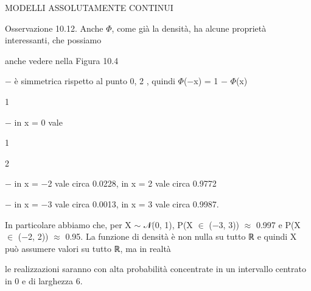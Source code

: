 \documentclass[a4paper,portrait,12pt]{article}
\begin{document}





\begin{flushleft}
MODELLI ASSOLUTAMENTE CONTINUI
\end{flushleft}





\begin{flushleft}
Osservazione 10.12. Anche $\Phi$, come gi\`{a} la densit\`{a}, ha alcune propriet\`{a} interessanti, che possiamo
\end{flushleft}


\begin{flushleft}
anche vedere nella Figura 10.4
\end{flushleft}


\begin{flushleft}
$-$ \`{e} simmetrica rispetto al punto 0, 2 , quindi $\Phi$($-$x) = 1 $-$ $\Phi$(x)
\end{flushleft}


1





\begin{flushleft}
$-$ in x = 0 vale
\end{flushleft}





1


2





\begin{flushleft}
$-$ in x = $-$2 vale circa 0.0228, in x = 2 vale circa 0.9772
\end{flushleft}


\begin{flushleft}
$-$ in x = $-$3 vale circa 0.0013, in x = 3 vale circa 0.9987.
\end{flushleft}


\begin{flushleft}
In particolare abbiamo che, per X $\sim$ 𝒩(0, 1), P(X $\in$ ($-$3, 3)) $\approx$ 0.997 e P(X $\in$ ($-$2, 2)) $\approx$ 0.95. La funzione di densit\`{a} \`{e} non nulla su tutto ℝ e quindi X pu\`{o} assumere valori su tutto ℝ, ma in realt\`{a}
\end{flushleft}


\begin{flushleft}
le realizzazioni saranno con alta probabilit\`{a} concentrate in un intervallo centrato in 0 e di larghezza 6.
\end{flushleft}
\end{document}

